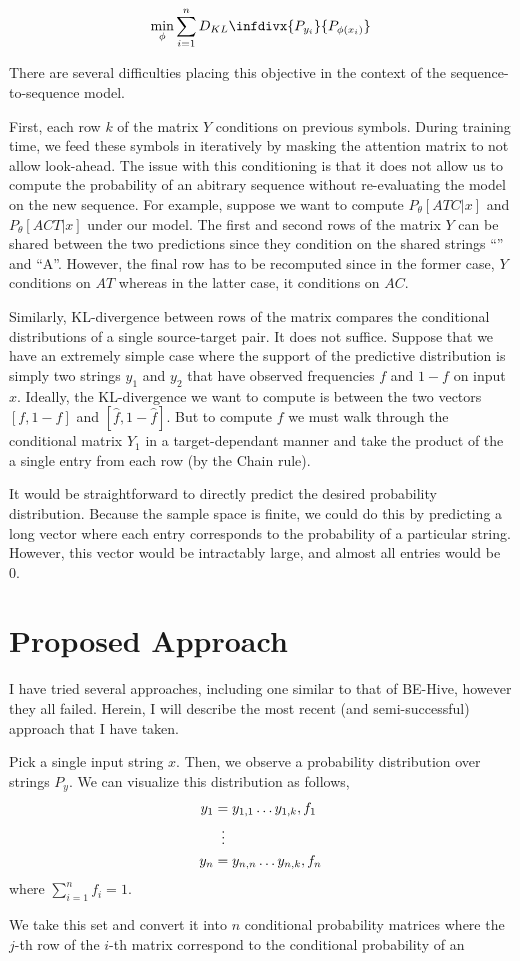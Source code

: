 \documentclass[12pt]{article}
\newcommand{\kld}[2]{\ensuremath{D_{KL}\infdivx{#1}{#2}}\xspace}
\begin{document}
$$\min_{\phi}\sum_{i=1}^n\kld{P_{y_i}}{P_{\phi(x_i)}}$$

There are several difficulties placing this objective in the context
of the sequence-to-sequence model.

First, each row $k$ of the matrix $Y$ conditions on previous
symbols. During training time, we feed these symbols in iteratively by
masking the attention matrix to not allow look-ahead. The issue with
this conditioning is that it does not allow us to compute the
probability of an abitrary sequence without re-evaluating the model on
the new sequence. For example, suppose we want to compute
$P_\theta[ATC | x]$ and $P_\theta[ACT | x]$ under our model. The first
and second rows of the matrix $Y$ can be shared between the two
predictions since they condition on the shared strings ``'' and
``A''. However, the final row has to be recomputed since in the former
case, $Y$ conditions on $AT$ whereas in the latter case, it conditions
on $AC$.

Similarly, KL-divergence between rows of the matrix compares the
conditional distributions of a single source-target pair. It does not
suffice. Suppose that we have an extremely simple case where the
support of the predictive distribution is simply two strings $y_1$ and
$y_2$ that have observed frequencies $f$ and $1-f$ on input
$x$. Ideally, the KL-divergence we want to compute is between the two
vectors $[f, 1-f]$ and $[\hat{f}, 1-\hat{f}]$. But to compute $f$ we
must walk through the conditional matrix $Y_1$ in a target-dependant
manner and take the product of the a single entry from each row (by
the Chain rule).

It would be straightforward to directly predict the desired
probability distribution. Because the sample space is finite, we could
do this by predicting a long vector where each entry corresponds to
the probability of a particular string. However, this vector would be
intractably large, and almost all entries would be 0.

\section*{Proposed Approach}

I have tried several approaches, including one similar to that of
BE-Hive, however they all failed. Herein, I will describe the most
recent (and semi-successful) approach that I have taken.

Pick a single input string $x$. Then, we observe a probability
distribution over strings $P_y$. We can visualize this distribution as
follows,
\begin{align*}
  y_1 &= y_{1,1}\ldots y_{1, k}, f_1\\
  &\;\;\vdots \notag \\
  y_n &= y_{n,n}\ldots y_{n, k}, f_n
\end{align*}
where $\sum_{i=1}^nf_i = 1$.

We take this set and convert it into $n$ conditional probability
matrices where the $j$-th row of the $i$-th matrix correspond to the
conditional probability of an 
\end{document}
